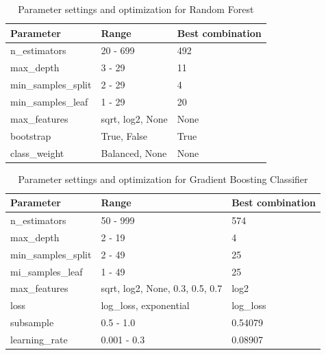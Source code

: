 \documentclass[a4paper,oneside,bibliography=totoc]{scrbook}
\begin{document}
\begin{table}[ht]
	\centering
	\fontsize{10}{12}\selectfont
	\begin{tabular}{|l|l|l|}
		\hline \textbf{Parameter} & \textbf{Range} & \textbf{Best combination} \\
		\hline n\_estimators & 20 - 699 & 492 \\
		\hline max\_depth & 3 - 29 & 11 \\
		\hline min\_samples\_split & 2 - 29 & 4 \\
		\hline min\_samples\_leaf & 1 - 29 & 20 \\
		\hline max\_features & sqrt, log2, None & None \\
		\hline bootstrap & True, False & True \\
		\hline class\_weight & Balanced, None & None \\
		\hline
	\end{tabular}
	\caption{Parameter settings and optimization for Random Forest}
	\label{tab:t2}
\end{table}


\begin{table}[ht]
	\centering
	\fontsize{10}{12}\selectfont
	\begin{tabular}{|l|l|l|}
		\hline \textbf{Parameter} & \textbf{Range} & \textbf{Best combination} \\
		\hline n\_estimators & 50 - 999 & 574 \\
		\hline max\_depth & 2 - 19 & 4 \\
		\hline min\_samples\_split & 2 - 49 & 25 \\
		\hline mi\_samples\_leaf & 1 - 49 & 25 \\
		\hline max\_features & sqrt, log2, None, 0.3, 0.5, 0.7 & log2 \\
		\hline loss & log\_loss, exponential & log\_loss \\
		\hline subsample & 0.5 - 1.0 & 0.54079 \\
		\hline learning\_rate & 0.001 - 0.3 & 0.08907 \\
		\hline
	\end{tabular}
	\caption{Parameter settings and optimization for Gradient Boosting Classifier}
	\label{tab:t3}
\end{table}
\end{document}

